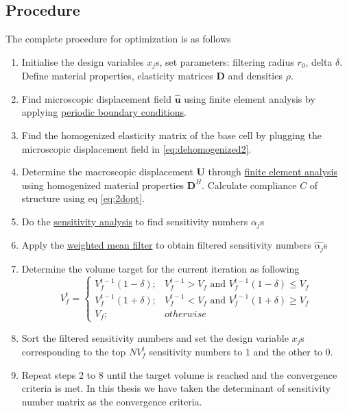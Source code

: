 \documentclass[10pt]{article}
\newcommand{\e}[1]{\textbf{#1}}
\begin{document}
\subsection{Procedure}
The complete procedure for optimization is as follows
\begin{enumerate}[start=1,label={Step \arabic*:}]
\item Initialise the design variables $x_j$s, set parameters: filtering radius $r_0$, delta $\delta$. Define material properties, elasticity matrices $\e D$ and densities $\rho$.
\item Find microscopic displacement field $\hat{\e u}$ using finite element analysis by applying \hyperref[sec:pbc]{periodic boundary conditions}.
\item Find the homogenized elasticity matrix of the base cell by plugging the microscopic displacement field in \eqref{eq:dehomogenized2}.
\item Determine the macroscopic displacement $\e U$ through \hyperref[eq:KM]{finite element analysis} using homogenized material properties $\e D^H$. Calculate compliance $C$ of structure using eq \eqref{eq:2dopt}.
\item Do the \hyperref[eq:senanal]{sensitivity analysis} to find sensitivity numbers $\alpha_j$s
\item Apply the \hyperref[eq:wmfilter]{weighted mean filter} to obtain filtered sensitivity numbers $\hat{\alpha_j}$s
\item Determine the volume target for the current iteration as following
\begin{equation}
V^t_f = 
\begin{cases}
V^{t-1}_f(1-\delta);& V^{t-1}_f>V_f \text{ and } V^{t-1}_f(1-\delta) \leq V_f\\
V^{t-1}_f(1+\delta);& V^{t-1}_f<V_f \text{ and } V^{t-1}_f(1+\delta) \geq V_f\\
V_f;& otherwise
\end{cases}
\end{equation}
\item Sort the filtered sensitivity numbers and set the design variable $x_j$s corresponding to the top $NV^t_f$ sensitivity numbers to $1$ and the other to $0$.
\item Repeat steps 2 to 8 until the target volume is reached and the convergence criteria is met. In this thesis we have taken the determinant of sensitivity number matrix as the convergence criteria.
\end{enumerate}
\end{document}
